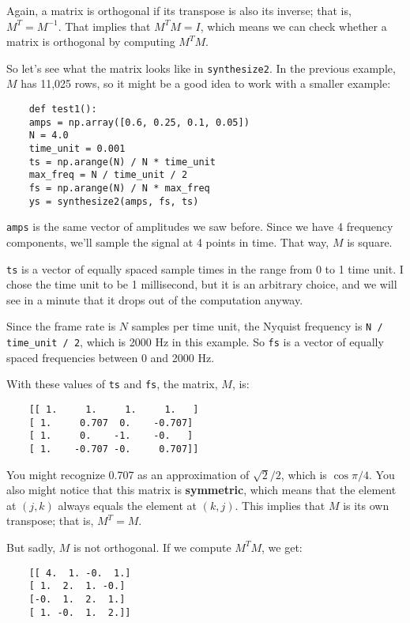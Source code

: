 Again, a matrix is orthogonal if its transpose is also its inverse;
that is, $M^T = M^{-1}$.  That implies that $M^TM = I$, which means we
can check whether a matrix is orthogonal by computing $M^TM$.

So let's see what the matrix looks like in {\tt synthesize2}.  In
the previous example, $M$ has 11,025 rows, so it might be a good idea
to work with a smaller example:

\begin{verbatim}
	def test1():
	amps = np.array([0.6, 0.25, 0.1, 0.05])
	N = 4.0
	time_unit = 0.001
	ts = np.arange(N) / N * time_unit
	max_freq = N / time_unit / 2
	fs = np.arange(N) / N * max_freq
	ys = synthesize2(amps, fs, ts)
\end{verbatim}

{\tt amps} is the same vector of amplitudes we saw before.
Since we have 4 frequency components, we'll sample the signal
at 4 points in time.  That way, $M$ is square.

{\tt ts} is a vector of equally spaced sample times in the range from
0 to 1 time unit.  I chose the time unit to be 1 millisecond, but it
is an arbitrary choice, and we will see in a minute that it drops out
of the computation anyway.

Since the frame rate is $N$ samples per time unit, the Nyquist
frequency is \verb"N / time_unit / 2", which is 2000 Hz in this
example.  So {\tt fs} is a vector of equally spaced frequencies
between 0 and 2000 Hz.

With these values of {\tt ts} and {\tt fs}, the matrix, $M$, is:

\begin{verbatim}
	[[ 1.     1.     1.     1.   ]
	[ 1.     0.707  0.    -0.707]
	[ 1.     0.    -1.    -0.   ]
	[ 1.    -0.707 -0.     0.707]]
\end{verbatim}

You might recognize 0.707 as an approximation of $\sqrt{2}/2$,
which is $\cos \pi/4$.  You also might notice that this matrix
is {\bf symmetric}, which means that the element at $(j, k)$ always
equals the element at $(k, j)$.  This implies that $M$ is its own
transpose; that is, $M^T = M$.

But sadly, $M$ is not orthogonal.  If we compute $M^TM$, we get:

\begin{verbatim}
	[[ 4.  1. -0.  1.]
	[ 1.  2.  1. -0.]
	[-0.  1.  2.  1.]
	[ 1. -0.  1.  2.]]
\end{verbatim}

